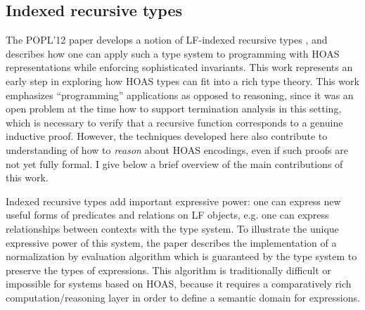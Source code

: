 \documentclass{article}
\begin{document}
\subsection{Indexed recursive types}
The POPL'12 paper develops a notion of LF-indexed recursive types
\citep{Cave12}, and describes how one can apply such a type system to programming with
HOAS representations while enforcing sophisticated invariants. This work
represents an early step in exploring how HOAS types can fit
into a rich type theory. This work emphasizes ``programming'' applications
as opposed to reasoning, since it was an open problem at the time how
to support termination analysis in this setting, which is necessary to
verify that a recursive function corresponds to a genuine inductive proof. However, the techniques
developed here also contribute to understanding of how to \emph{reason} about
HOAS encodings, even if such proofs are not yet fully formal. 
I give below a brief overview of the main contributions of this work.

Indexed recursive types add important expressive power: one can express
new useful forms of predicates and relations on LF objects, e.g. one
can express relationships between contexts with the type system. To illustrate the unique expressive
power of this system, the paper describes the implementation of a normalization by evaluation
algorithm which is guaranteed by the type system to preserve the 
types of expressions. This algorithm is traditionally 
difficult or impossible for systems based on HOAS, because it requires
a comparatively rich computation/reasoning layer in order to define a semantic domain for expressions.
\end{document}
